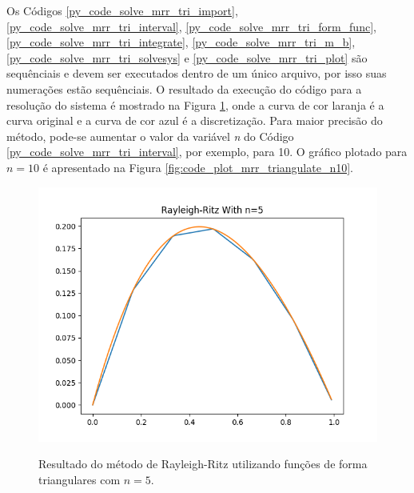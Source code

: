 \documentclass[
	12pt,				%
	openright,			%
    twoside,			%
	a4paper,			%
	english,			%
	french,				%
	spanish,			%
	brazil				%
	]{abntex2}
\numberwithin{lema}{chapter}
\numberwithin{teorema}{chapter}
\numberwithin{definicao}{chapter}
\numberwithin{exemplo}{chapter}
\numberwithin{figure}{chapter}
\begin{document}
Os Códigos \ref{py_code_solve_mrr_tri_import}, \ref{py_code_solve_mrr_tri_interval}, \ref{py_code_solve_mrr_tri_form_func}, \ref{py_code_solve_mrr_tri_integrate}, \ref{py_code_solve_mrr_tri_m_b}, \ref{py_code_solve_mrr_tri_solvesys} e \ref{py_code_solve_mrr_tri_plot} são sequênciais e devem ser executados dentro de um único arquivo, por isso suas numerações estão sequênciais. O resultado da execução do código para a resolução do sistema é mostrado na Figura \ref{fig:code_plot_mrr_triangulate}, onde a curva de cor laranja é a curva original e a curva de cor azul é a discretização. Para maior precisão do método, pode-se aumentar o valor da variável \textit{n} do Código \ref{py_code_solve_mrr_tri_interval}, por exemplo, para 10. O gráfico plotado para $n=10$ é apresentado na Figura \ref{fig:code_plot_mrr_triangulate_n10}.

\begin{figure}[h]
	\caption{Resultado do método de Rayleigh-Ritz utilizando funções de forma triangulares com $n=5$.}
	\centering
	\includegraphics[scale=0.8]{../figuras/code/code_plot_mrr_triangulate.png}
	\label{fig:code_plot_mrr_triangulate}
\end{figure}
\end{document}
